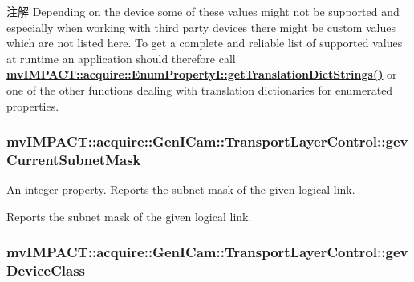\begin{DoxyNote}{注解}
Depending on the device some of these values might not be supported and especially when working with third party devices there might be custom values which are not listed here. To get a complete and reliable list of supported values at runtime an application should therefore call {\bfseries \hyperlink{classmv_i_m_p_a_c_t_1_1acquire_1_1_enum_property_i_a0ba6ccbf5ee69784d5d0b537924d26b6}{mv\+I\+M\+P\+A\+C\+T\+::acquire\+::\+Enum\+Property\+I\+::get\+Translation\+Dict\+Strings()}} or one of the other functions dealing with translation dictionaries for enumerated properties. 
\end{DoxyNote}
\hypertarget{classmv_i_m_p_a_c_t_1_1acquire_1_1_gen_i_cam_1_1_transport_layer_control_a918962f6fec862f87de9d3f4a06aea01}{
\subsubsection[{gev\+Current\+Subnet\+Mask}]{ mv\+I\+M\+P\+A\+C\+T\+::acquire\+::\+Gen\+I\+Cam\+::\+Transport\+Layer\+Control\+::gev\+Current\+Subnet\+Mask}}\label{classmv_i_m_p_a_c_t_1_1acquire_1_1_gen_i_cam_1_1_transport_layer_control_a918962f6fec862f87de9d3f4a06aea01}


An integer property. Reports the subnet mask of the given logical link. 

Reports the subnet mask of the given logical link. \hypertarget{classmv_i_m_p_a_c_t_1_1acquire_1_1_gen_i_cam_1_1_transport_layer_control_ae45e57b8dbf5f7326d7821b34ca5b937}{
\subsubsection[{gev\+Device\+Class}]{ mv\+I\+M\+P\+A\+C\+T\+::acquire\+::\+Gen\+I\+Cam\+::\+Transport\+Layer\+Control\+::gev\+Device\+Class}}\label{classmv_i_m_p_a_c_t_1_1acquire_1_1_gen_i_cam_1_1_transport_layer_control_ae45e57b8dbf5f7326d7821b34ca5b937}


